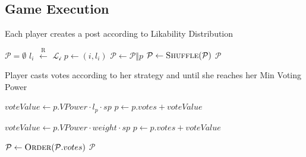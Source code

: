  \subsection{Game Execution}
    \begin{algorithm}
      \caption{Each player creates a post according to Likability Distribution}
      \label{alg:postGeneration}
      \begin{algorithmic}[1]
        \State $\mathcal{P} = \emptyset$ 
           \State $l_i$ $\xleftarrow{\text{R}}$ $\mathcal{L_i}$
           \State $p \leftarrow (i,l_i)$
           \State $\mathcal{P} \leftarrow \mathcal{P} \Vert p$
        \EndFor
        \State $\mathcal{P} \leftarrow \textsc{Shuffle}(\mathcal{P})$
        \State \Return $\mathcal{P}$
      \EndFunction
      \end{algorithmic}
    \end{algorithm}

    \begin{algorithm}[H]
      \caption{Player casts votes according to her strategy and until she
      reaches her Min Voting Power}
      \label{alg:vote}
      \begin{algorithmic}[1]
              \State
                \State $voteValue \leftarrow p.VPower \cdot l_p \cdot sp$
                \State $p \leftarrow p.votes +  voteValue$
              \EndIf
            \EndFor
          \EndCase

               \State
                 \State $voteValue \leftarrow p.VPower \cdot weight \cdot sp$
                 \State $p \leftarrow p.votes +  voteValue$
               \EndIf
             \EndFor
          \EndCase
        \EndSwitch

        \State $\mathcal{P} \leftarrow \textsc{Order}(\mathcal{P}.votes)$
        \State \Return $\mathcal{P}$
      \EndFunction
      \end{algorithmic}
    \end{algorithm}

